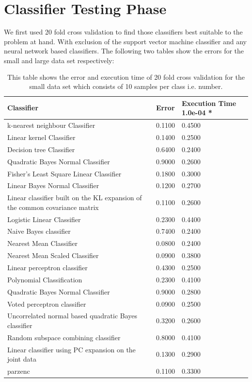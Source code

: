 \documentclass[%
        compressed,
        final,
        notitlepage,
        narroweqnarray,
        inline,
        twoside,
        ]{ieee}
\begin{document}
\section{Classifier Testing Phase}
We first used 20 fold cross validation to find those classifiers best suitable to the problem at hand. With exclusion of the support vector machine classifier and any neural network based classifiers. The following two tables show the errors for the small and large data set respectively:
\begin{table}
    \begin{tabular} {p{5cm}lp{1.5cm}} %
        \hline
    Classifier & Error & Execution Time 1.0e-04 * \\
        \hline
    k-nearest neighbour Classifier & 0.1100 & 0.4500 \\
    Linear kernel Classifier & 0.1400 & 0.2500 \\
    Decision tree Classifier & 0.6400 & 0.2400 \\
    Quadratic Bayes Normal Classifier & 0.9000 & 0.2600 \\
    Fisher's Least Square Linear Classifier & 0.1800 & 0.3000 \\
    Linear Bayes Normal Classifier & 0.1200 & 0.2700 \\
    Linear classifier built on the KL expansion of the common covariance matrix & 0.1100 & 0.2600 \\
    Logistic Linear Classifier & 0.2300 & 0.4400 \\
    Naive Bayes classifier & 0.7400 & 0.2400 \\
    Nearest Mean Classifier & 0.0800 & 0.2400 \\
    Nearest Mean Scaled Classifier & 0.0900 & 0.3800 \\
    Linear perceptron classifier & 0.4300 & 0.2500 \\
    Polynomial Classification & 0.2300 & 0.4100 \\
    Quadratic Bayes Normal Classifier & 0.9000 & 0.2800 \\
    Voted perceptron classifier & 0.0900 & 0.2500 \\
    Uncorrelated normal based quadratic Bayes classifier & 0.3200 & 0.2600 \\
    Random subspace combining classifier & 0.8000 & 0.4100 \\
        Linear classifier using PC expansion on the joint data & 0.1300 & 0.2900 \\
    parzenc & 0.1100 & 0.3300 \\
        \hline
    \end{tabular}
    \caption{This table shows the error and execution time of 20 fold cross
    validation for the small data set which consists of 10 samples per class
i.e. number.}
\end{table}
\end{document}
